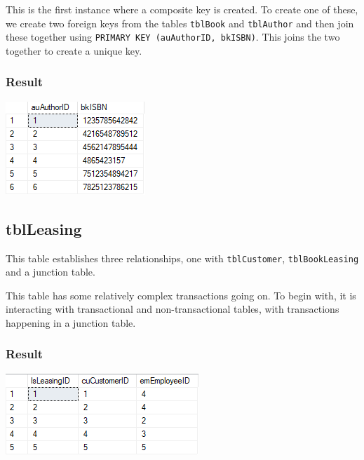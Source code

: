 \documentclass[11pt,a4paper]{scrartcl}
\begin{document}
	
	
	This is the first instance where a composite key is created. To create one of these, we create two foreign keys from the tables \texttt{tblBook} and \texttt{tblAuthor} and then join these together using \texttt{PRIMARY KEY (auAuthorID, bkISBN)}. This joins the two together to create a unique key.
	
	\subsubsection*{Result}
	
	\begin{center}
		\includegraphics[width=0.35\linewidth]{images/BookAuthor}
	\end{center}
	
	\subsection{tblLeasing}\label{tblleasing}
	
	This table establishes three relationships, one with \texttt{tblCustomer}, \texttt{tblBookLeasing} and a junction table.
	
	
	
	This table has some relatively complex transactions going on. To begin with, it is interacting with transactional and non-transactional tables, with transactions happening in a junction table.
	
	\subsubsection*{Result}
	
	\begin{center}
		\includegraphics[width=0.45\linewidth]{images/Leasing}
	\end{center}
	
\end{document}
